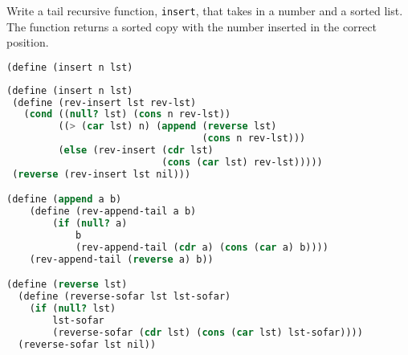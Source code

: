 \question
Write a tail recursive function, \texttt{insert}, that takes in a number and a
sorted list. The function returns a sorted copy with the number inserted in the
correct position.
\begin{lstlisting}[language=Scheme]
(define (insert n lst)
\end{lstlisting}
\begin{solution}[1in]
\begin{lstlisting}[language=Scheme]
(define (insert n lst)
 (define (rev-insert lst rev-lst)
   (cond ((null? lst) (cons n rev-lst))
         ((> (car lst) n) (append (reverse lst)
                                  (cons n rev-lst)))
         (else (rev-insert (cdr lst)
                           (cons (car lst) rev-lst)))))
 (reverse (rev-insert lst nil)))

(define (append a b)
    (define (rev-append-tail a b)
        (if (null? a)
            b
            (rev-append-tail (cdr a) (cons (car a) b))))
    (rev-append-tail (reverse a) b))

(define (reverse lst)
  (define (reverse-sofar lst lst-sofar)
    (if (null? lst)
        lst-sofar
        (reverse-sofar (cdr lst) (cons (car lst) lst-sofar))))
  (reverse-sofar lst nil))
\end{lstlisting}
\end{solution}
